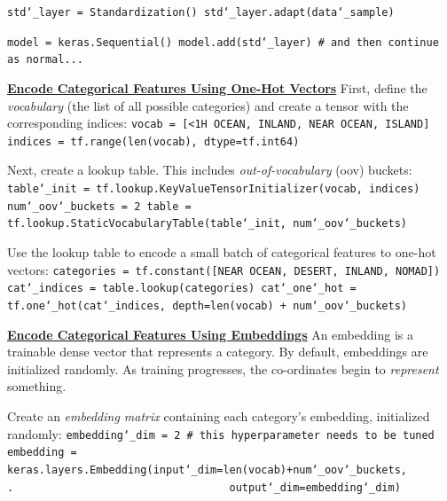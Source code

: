 \texttt{std\char`_layer = Standardization()\newline
std\char`_layer.adapt(data\char`_sample)}

\texttt{model = keras.Sequential()\newline
model.add(std\char`_layer) \# and then continue as normal...}\newline

\textbf{\underline{Encode Categorical Features Using One-Hot Vectors}}\newline
First, define the \textit{vocabulary} (the list of all possible categories)\newline
and create a tensor with the corresponding indices:\newline
\texttt{vocab = [\textquotesingle <1H OCEAN\textquotesingle, \textquotesingle INLAND\textquotesingle, \textquotesingle NEAR OCEAN\textquotesingle, \textquotesingle ISLAND\textquotesingle]}\newline
\texttt{indices = tf.range(len(vocab), dtype=tf.int64)}

Next, create a lookup table.
This includes \textit{out-of-vocabulary} (oov) buckets:\newline
\texttt{table\char`_init = tf.lookup.KeyValueTensorInitializer(vocab, indices)\newline
num\char`_oov\char`_buckets = 2\newline
table = tf.lookup.StaticVocabularyTable(table\char`_init, num\char`_oov\char`_buckets)}

Use the lookup table to encode a small batch of categorical features to one-hot vectors:\newline
\texttt{categories = tf.constant([\textquotesingle NEAR OCEAN\textquotesingle, \textquotesingle DESERT\textquotesingle, \textquotesingle INLAND\textquotesingle, \textquotesingle NOMAD\textquotesingle])\newline
cat\char`_indices = table.lookup(categories)\newline
cat\char`_one\char`_hot = tf.one\char`_hot(cat\char`_indices, depth=len(vocab) + num\char`_oov\char`_buckets)}\newline

\textbf{\underline{Encode Categorical Features Using Embeddings}}\newline
An embedding is a trainable dense vector that represents a category.
By default, embeddings are initialized randomly.
As training progresses, the co-ordinates begin to \textit{represent} something.

Create an \textit{embedding matrix} containing each category's embedding, initialized randomly:\newline
\texttt{embedding\char`_dim = 2 \# this hyperparameter needs to be tuned\newline
embedding = keras.layers.Embedding(input\char`_dim=len(vocab)+num\char`_oov\char`_buckets,\newline
.~~~~~~~~~~~~~~~~~~~~~~~~~~~~~~~~~~output\char`_dim=embedding\char`_dim)}

